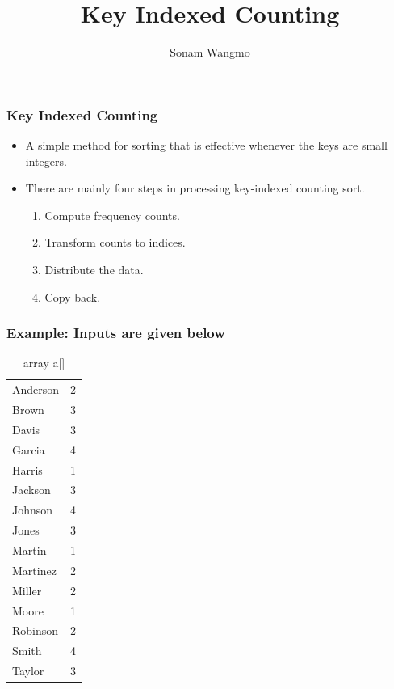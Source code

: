 \documentclass[11pt]{beamer}
\begin{document}
	\author{Sonam Wangmo}
	\title{Key Indexed Counting}
	\subject{ITS202: Algorithms and Data Structure}
	\begin{frame}[plain]
		\maketitle
	\end{frame}
	
	\begin{frame}
		\frametitle{Key Indexed Counting}
			\begin{itemize}
			\item 	A simple method for sorting that is effective whenever the keys are small integers.\\
		
			\item There are mainly four steps in processing key-indexed counting sort.
			\begin{enumerate}
				\item Compute frequency counts.
				\item Transform counts to indices.
				\item Distribute the data.
				\item Copy back.
				\end{enumerate}		 
		\end{itemize}	
	\end{frame}

\begin{frame}
	\frametitle{Example: Inputs are given below}
\begin{table}[htbp]
  \centering
  \caption{array a[]}
    \begin{tabular}{lr}
    Anderson & 2 \\
    Brown & 3 \\
    Davis & 3 \\
    Garcia & 4 \\
    Harris & 1 \\
    Jackson & 3 \\
    Johnson & 4 \\
    Jones & 3 \\
    Martin & 1 \\
    Martinez & 2 \\
    Miller & 2 \\
    Moore & 1 \\
    Robinson & 2 \\
    Smith & 4 \\
    Taylor & 3 \\
    \end{tabular}%
  \label{}%
\end{table}%

\end{frame}
\end{document}
